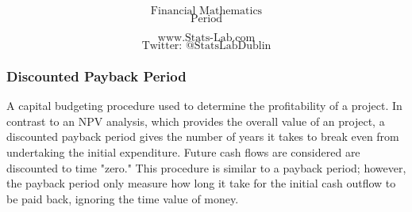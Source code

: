 \documentclass{beamer}
\begin{document}
\begin{frame}
\bigskip
{
\Huge
\[ \mbox{Financial Mathematics}  \]
\huge
\[ \mbox{
 Period}  \]
}

{
\LARGE
\[ \mbox{www.Stats-Lab.com}  \]
\[ \mbox{Twitter: @StatsLabDublin} \]
}
\end{frame}
\begin{frame}
\frametitle{Discounted Payback Period}
A capital budgeting procedure used to determine the profitability of a project. In contrast to an NPV analysis, which provides the overall value of an project, a discounted payback period gives the number of years it takes to break even from undertaking the initial expenditure. Future cash flows are considered are discounted to time "zero." This procedure is similar to a payback period; however, the payback period only measure how long it take for the initial cash outflow to be paid back, ignoring the time value of money.
\end{frame}
\end{document}
